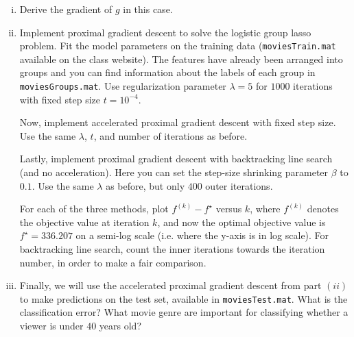 \documentclass{article}
\theoremstyle{remark}
\theoremstyle{definition}
\begin{document}
\begin{enumerate}[(a)]
  \begin{enumerate}[(i)]
  \item Derive the gradient of $g$ in this case.

  \item Implement proximal gradient descent to solve the logistic group lasso
    problem. Fit the model parameters on the training data
    (\texttt{moviesTrain.mat} available on the class website). The features have
    already been arranged into groups and you can find information about the
    labels of each group in \texttt{moviesGroups.mat}. Use regularization
    parameter $\lambda = 5$ for $1000$ iterations with fixed step size
    $t = 10^{-4}$.

    Now, implement accelerated proximal gradient descent with fixed step
    size. Use the same $\lambda$, $t$, and number of iterations as before.

    Lastly, implement proximal gradient descent with backtracking line search
    (and no acceleration). Here you can set the step-size shrinking parameter
    $\beta$ to $0.1$. Use the same $\lambda$ as before, but only $400$ outer
    iterations.

    For each of the three methods, plot $f^{(k)}-f^\star$ versus $k$,
    where $f^{(k)}$ denotes the objective value at iteration $k$, and
    now the optimal objective value is $f^\star = 336.207$ on a semi-log scale (i.e. where the y-axis is in log scale). For
    backtracking line search, count the inner iterations towards the
    iteration number, in order to make a fair comparison. 

  \item Finally, we will use the accelerated proximal gradient descent from part
    $(ii)$ to make predictions on the test set, available in
    \texttt{moviesTest.mat}. What is the classification error? What movie genre
    are important for classifying whether a viewer is under $40$ years old?
  \end{enumerate}

\end{enumerate}
\end{document}
